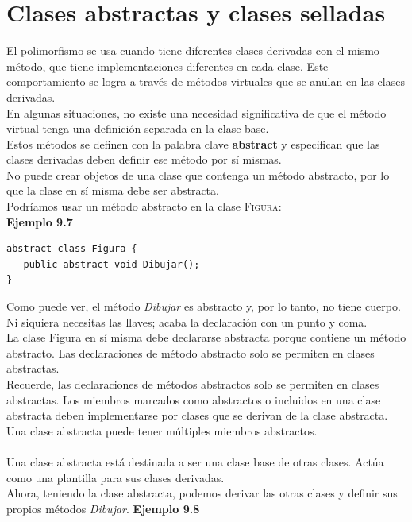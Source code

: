 \documentclass[12pt,a4paper]{report}
\begin{document}
\section{Clases abstractas y clases selladas}
El polimorfismo se usa cuando tiene diferentes clases derivadas con el mismo método, que tiene implementaciones diferentes en cada clase. Este comportamiento se logra a través de métodos virtuales que se anulan en las clases derivadas.\\En algunas situaciones, no existe una necesidad significativa de que el método virtual tenga una definición separada en la clase base.\\Estos métodos se definen con la palabra clave\textbf{ abstract} y especifican que las clases derivadas deben definir ese método por sí mismas.\\No puede crear objetos de una clase que contenga un método abstracto, por lo que la clase en sí misma debe ser abstracta.\\Podríamos usar un método abstracto en la clase \textsc{Figura}:\\\textbf{Ejemplo 9.7}
\begin{lstlisting}
abstract class Figura {
   public abstract void Dibujar();
}
\end{lstlisting}Como puede ver, el método\textit{ Dibujar} es abstracto y, por lo tanto, no tiene cuerpo. Ni siquiera necesitas las llaves; acaba la declaración con un punto y coma.\\La clase Figura en sí misma debe declararse abstracta porque contiene un método abstracto. Las declaraciones de método abstracto solo se permiten en clases abstractas.\\Recuerde, las declaraciones de métodos abstractos solo se permiten en clases abstractas. Los miembros marcados como abstractos o incluidos en una clase abstracta deben implementarse por clases que se derivan de la clase abstracta. Una clase abstracta puede tener múltiples miembros abstractos.\\\\Una clase abstracta está destinada a ser una clase base de otras clases. Actúa como una plantilla para sus clases derivadas.\\Ahora, teniendo la clase abstracta, podemos derivar las otras clases y definir sus propios métodos\textit{ Dibujar}.
\textbf{Ejemplo 9.8}
\end{document}
